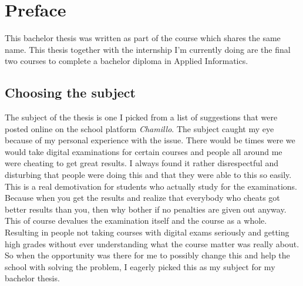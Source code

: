 
\chapter*{Preface}
\label{ch:voorwoord}


This bachelor thesis was written as part of the course which shares the same name. This thesis together with the internship I'm currently doing are the final two courses to complete a bachelor diploma in Applied Informatics.
\section*{Choosing the subject}
The subject of the thesis is one I picked from a list of suggestions that were posted online on the school platform \textit{Chamillo}. The subject caught my eye because of my personal experience with the issue. There would be times were we would take digital examinations for certain courses and people all around me were cheating to get great results. I always found it rather disrespectful and disturbing that people were doing this and that they were able to this so easily. This is a real demotivation for students who actually study for the examinations. Because when you get the results and realize that everybody who cheats got better results than you, then why bother if no penalties are given out anyway.\\
This of course devalues the examination itself and the course as a whole. Resulting in people not taking courses with digital exams seriously and getting high grades without ever understanding what the course matter was really about.\\
So when the opportunity was there for me to possibly change this and help the school with solving the problem, I eagerly picked this as my subject for my bachelor thesis.